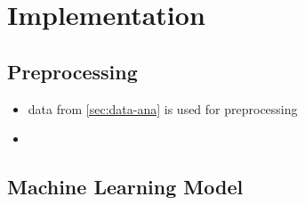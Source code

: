 \chapter{Implementation}

\section{Preprocessing}
    \begin{itemize}
        \item data from \cref{sec:data-ana} is used for preprocessing
        \item 
    \end{itemize}

\section{Machine Learning Model}

